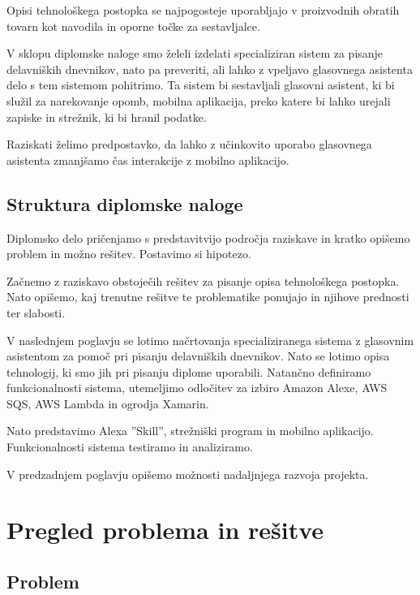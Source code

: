 \documentclass[a4paper, 12pt]{book}
\begin{document}
Opisi tehnološkega postopka se najpogosteje uporabljajo v proizvodnih obratih tovarn kot navodila in oporne točke za sestavljalce.

V sklopu diplomske naloge smo želeli izdelati specializiran sistem za pisanje delavniških dnevnikov, nato pa preveriti, ali lahko z vpeljavo glasovnega asistenta delo s tem sistemom pohitrimo.
Ta sistem bi sestavljali glasovni asistent, ki bi služil za narekovanje opomb, mobilna aplikacija, preko katere bi lahko urejali zapiske in strežnik, ki bi hranil podatke.

Raziskati želimo predpostavko, da lahko z učinkovito uporabo glasovnega asistenta zmanjšamo čas interakcije z mobilno aplikacijo.


\section{Struktura diplomske naloge}

Diplomsko delo pričenjamo s predstavitvijo področja raziskave in kratko opišemo problem in možno rešitev. 
Postavimo si hipotezo.

Začnemo z raziskavo obstoječih rešitev za pisanje opisa tehnološkega postopka.
Nato opišemo, kaj trenutne rešitve te problematike ponujajo in njihove prednosti ter slabosti.

V naslednjem poglavju se lotimo načrtovanja specializiranega sistema z glasovnim asistentom za pomoč pri pisanju delavniških dnevnikov.
Nato se lotimo opisa tehnologij, ki smo jih pri pisanju diplome uporabili.
Natančno definiramo funkcionalnosti sistema, utemeljimo odločitev za izbiro Amazon Alexe, AWS SQS, AWS Lambda in ogrodja Xamarin.

Nato predstavimo Alexa ''Skill'', strežniški program in mobilno aplikacijo.
Funkcionalnosti sistema testiramo in analiziramo.

V predzadnjem poglavju opišemo možnosti nadaljnjega razvoja projekta.

\chapter{Pregled problema in rešitve}

\section{Problem}
\end{document}
